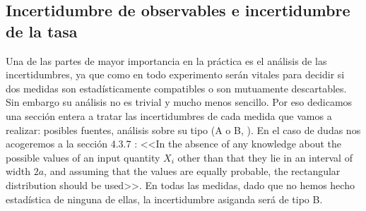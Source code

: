 \documentclass[11pt]{article}
\begin{document}
\subsection{Incertidumbre de observables e incertidumbre de la tasa}

Una de las partes de mayor importancia en la práctica es el análisis de las incertidumbres, ya que como en todo experimento serán vitales para decidir si dos medidas son estadísticamente compatibles o son mutuamente descartables. Sin embargo su análisis no es trivial y mucho menos sencillo. Por eso dedicamos una sección entera a tratar las incertidumbres de cada medida que vamos a realizar: posibles fuentes, análisis sobre su tipo (A o B, \cite{GUM1995}). En el caso de dudas nos acogeremos a la sección 4.3.7 \cite{GUM1995}: <<In the absence of any knowledge about the possible values of an input quantity $X_i$ other than that they lie in an interval of width $2a$, and assuming that the values are equally probable, the rectangular distribution should be used>>. En todas las medidas, dado que no hemos hecho estadística de ninguna de ellas, la incertidumbre asiganda será de tipo B. \\
\end{document}
